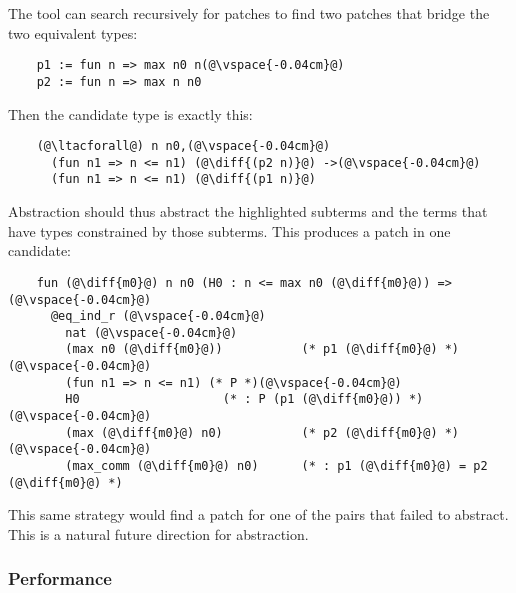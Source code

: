 The tool can search recursively for patches to find two patches that bridge the two equivalent
types:

\begin{lstlisting}
    p1 := fun n => max n0 n(@\vspace{-0.04cm}@)
    p2 := fun n => max n n0
\end{lstlisting}

Then the candidate type is exactly this:

\begin{lstlisting}
    (@\ltacforall@) n n0,(@\vspace{-0.04cm}@)
      (fun n1 => n <= n1) (@\diff{(p2 n)}@) ->(@\vspace{-0.04cm}@)
      (fun n1 => n <= n1) (@\diff{(p1 n)}@)
\end{lstlisting}

Abstraction should thus abstract the highlighted subterms and the
terms that have types constrained by those subterms.
This produces a patch in one candidate:

\begin{lstlisting}
    fun (@\diff{m0}@) n n0 (H0 : n <= max n0 (@\diff{m0}@)) =>(@\vspace{-0.04cm}@)
      @eq_ind_r (@\vspace{-0.04cm}@)
        nat (@\vspace{-0.04cm}@)
        (max n0 (@\diff{m0}@))           (* p1 (@\diff{m0}@) *)(@\vspace{-0.04cm}@)
        (fun n1 => n <= n1) (* P *)(@\vspace{-0.04cm}@)
        H0                    (* : P (p1 (@\diff{m0}@)) *)(@\vspace{-0.04cm}@)
        (max (@\diff{m0}@) n0)           (* p2 (@\diff{m0}@) *)(@\vspace{-0.04cm}@)
        (max_comm (@\diff{m0}@) n0)      (* : p1 (@\diff{m0}@) = p2 (@\diff{m0}@) *)
\end{lstlisting}

This same strategy would find a patch for one of the pairs that \sysname failed to 
abstract. %
This is a natural future direction for abstraction.

\subsubsection{Performance}
\label{sec:perf}

